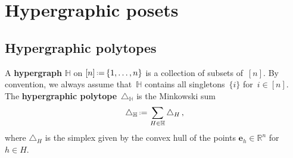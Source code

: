 \documentclass{amsart}
\theoremstyle{definition}
\newcommand{\R}{\mathbb{R}} %
\renewcommand{\b}[1]{\boldsymbol{#1}} %
\newcommand{\eqdef}{\mbox{\,\raisebox{0.2ex}{\scriptsize\ensuremath{\mathrm:}}\ensuremath{=}\,}} %
\newcommand{\simplex}{\triangle} %
\newcommand{\defn}[1]{\textbf{\textsf{\color{PineGreen} #1}}} %
\newcommand{\HH}{\mathbb H}  %
\begin{document}
\setcounter{theoremA}{0}


\section{Hypergraphic posets}
\label{sec:HP}


\subsection{Hypergraphic polytopes}
\label{subsec:D_H}

A \defn{hypergraph} $\HH$ on $[n] \eqdef \{1, \dots, n\}$ is a collection of  subsets of~$[n]$.
By convention, we always assume that~$\HH$ contains all singletons~$\{i\}$ for~$i\in [n]$.
The \defn{hypergraphic polytope}~$\simplex_\HH$ is the Minkowski sum
\[
\simplex_\HH \eqdef \sum_{H\in \HH} \simplex_H\,,
\]
where $\simplex_H$ is the simplex given by the convex hull of the points $\b{e}_h \in \R^n$ for~$h \in H$.
\end{document}
